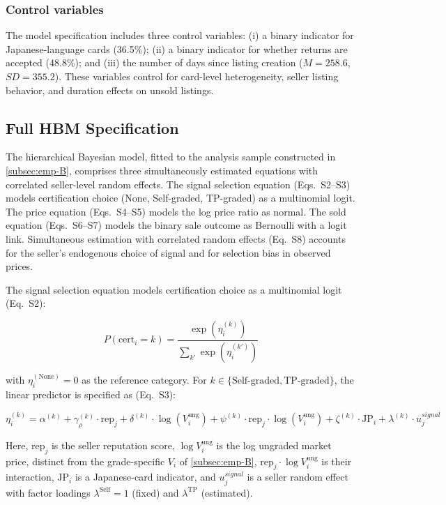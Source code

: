 \documentclass[11pt,letterpaper]{article}
\theoremstyle{definition}
\begin{document}
\subsubsection{Control variables}

The model specification includes three control variables: (i) a binary indicator for Japanese-language cards (36.5\%); (ii) a binary indicator for whether returns are accepted (48.8\%); and (iii) the number of days since listing creation ($M = 258.6$, $SD = 355.2$). These variables control for card-level heterogeneity, seller listing behavior, and duration effects on unsold listings.

\subsection{Full HBM Specification}\label{subsec:emp-C}

The hierarchical Bayesian model, fitted to the analysis sample constructed in \ref{subsec:emp-B}, comprises three simultaneously estimated equations with correlated seller-level random effects. The signal selection equation (Eqs.~S2--S3) models certification choice (None, Self-graded, TP-graded) as a multinomial logit. The price equation (Eqs.~S4--S5) models the log price ratio as normal. The sold equation (Eqs.~S6--S7) models the binary sale outcome as Bernoulli with a logit link. Simultaneous estimation with correlated random effects (Eq.~S8) accounts for the seller's endogenous choice of signal and for selection bias in observed prices.

The signal selection equation models certification choice as a multinomial logit (Eq.~S2):

\begin{equation}
P(\text{cert}_i = k) = \frac{\exp(\eta_i^{(k)})}{\sum_{k'} \exp(\eta_i^{(k')})} \label{eq:s2}
\end{equation}

with $\eta_i^{(\text{None})} = 0$ as the reference category. For $k \in \{\text{Self-graded}, \text{TP-graded}\}$, the linear predictor is specified as (Eq.~S3):

\begin{equation}
\eta_i^{(k)} = \alpha^{(k)} + \gamma_\rho^{(k)} \cdot \text{rep}_j + \delta^{(k)} \cdot \log(V_i^{\text{ung}}) + \psi^{(k)} \cdot \text{rep}_j \cdot \log(V_i^{\text{ung}}) + \zeta^{(k)} \cdot \text{JP}_i + \lambda^{(k)} \cdot u_j^{signal} \label{eq:s3}
\end{equation}

Here, $\text{rep}_j$ is the seller reputation score, $\log V_i^{\text{ung}}$ is the log ungraded market price, distinct from the grade-specific $V_i$ of \ref{subsec:emp-B}, $\text{rep}_j \cdot \log V_i^{\text{ung}}$ is their interaction, $\text{JP}_i$ is a Japanese-card indicator, and $u_j^{signal}$ is a seller random effect with factor loadings $\lambda^{\text{Self}} = 1$ (fixed) and $\lambda^{\text{TP}}$ (estimated).
\end{document}
